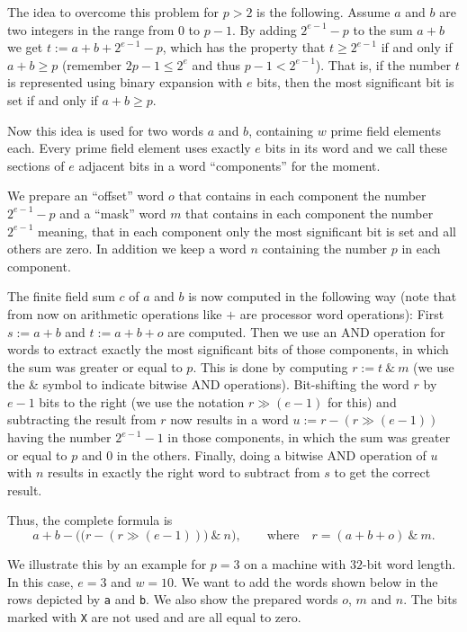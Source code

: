The idea to overcome this problem for $p > 2$ is the following. 
Assume $a$ and $b$
are two integers in the range from $0$ to $p-1$. By adding
$2^{e-1}-p$ to the sum $a+b$ we get $t := a+b+2^{e-1}-p$, which
has the property that $t \ge 2^{e-1}$ if and only if $a+b \ge p$
(remember $2p-1 \le 2^e$ and thus $p-1 < 2^{e-1}$). That is, if
the number $t$ is represented using binary expansion with $e$ bits,
then the most significant bit is set if and only if $a+b \ge p$.

Now this idea is used for two words $a$ and $b$, containing $w$
prime field elements each. Every prime field element uses exactly $e$ bits
in its word and we call these sections of $e$ adjacent bits in a word 
``components'' for the moment. 

We prepare an ``offset'' word $o$ that contains in each component the
number $2^{e-1}-p$ and a ``mask'' word $m$ that contains in each component
the number $2^{e-1}$ meaning, that in each component only the most significant
bit is set and all others are zero. In addition we keep a word $n$
containing the number $p$ in each component.

The finite field sum $c$ of $a$ and $b$ is now computed in the following
way (note that from now on arithmetic operations like $+$ are
processor word operations):
First $s := a+b$ and $t := a+b+o$ are computed. Then we use an AND 
operation for words to extract exactly the most significant bits of
those components, in which the sum was greater or equal to $p$.
This is done by computing $r := t \ \&\  m$ (we use the \& symbol to
indicate bitwise AND operations). Bit-shifting
the word $r$ by $e-1$ bits to the right (we use the notation
$r \gg (e-1)$ for this) and subtracting the
result from $r$ now results in a word $u := r - (r \gg (e-1))$
having the number $2^{e-1}-1$
in those components, in which the sum was greater or equal to $p$ and
$0$ in the others. Finally, doing a bitwise AND operation of $u$ with
$n$ results in exactly the right word to subtract from $s$ to get
the correct result.

Thus, the complete formula is
\[ a+b - \Big(\big(r - (r \gg (e-1))\big) \ \&\ n \Big),
   \qquad \mbox{where}\quad r = (a+b+o) \ \&\  m . \]

We illustrate this by an example for $p=3$ on a machine with
$32$-bit word length. In this case, $e = 3$ and $w = 10$. We want to
add the words shown below in the rows depicted by \texttt{a} and \texttt{b}.
We also show the prepared words $o$, $m$ and $n$. The bits marked
with \texttt{X} are not used and are all equal to zero.

